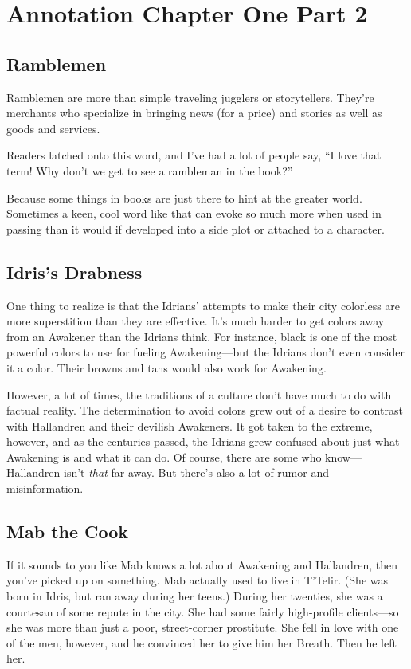 \section{Annotation Chapter One Part 2}

\subsection*{Ramblemen}

Ramblemen are more than simple traveling jugglers or storytellers. They’re merchants who specialize in bringing news (for a price) and stories as well as goods and services.

Readers latched onto this word, and I’ve had a lot of people say, “I love that term! Why don’t we get to see a rambleman in the book?”

Because some things in books are just there to hint at the greater world. Sometimes a keen, cool word like that can evoke so much more when used in passing than it would if developed into a side plot or attached to a character.

\subsection*{Idris’s Drabness}

One thing to realize is that the Idrians’ attempts to make their city colorless are more superstition than they are effective. It’s much harder to get colors away from an Awakener than the Idrians think. For instance, black is one of the most powerful colors to use for fueling Awakening—but the Idrians don’t even consider it a color. Their browns and tans would also work for Awakening.

However, a lot of times, the traditions of a culture don’t have much to do with factual reality. The determination to avoid colors grew out of a desire to contrast with Hallandren and their devilish Awakeners. It got taken to the extreme, however, and as the centuries passed, the Idrians grew confused about just what Awakening is and what it can do. Of course, there are some who know—Hallandren isn’t \textit{that} far away. But there’s also a lot of rumor and misinformation.

\subsection*{Mab the Cook}

If it sounds to you like Mab knows a lot about Awakening and Hallandren, then you’ve picked up on something. Mab actually used to live in T’Telir. (She was born in Idris, but ran away during her teens.) During her twenties, she was a courtesan of some repute in the city. She had some fairly high-profile clients—so she was more than just a poor, street-corner prostitute. She fell in love with one of the men, however, and he convinced her to give him her Breath. Then he left her.

